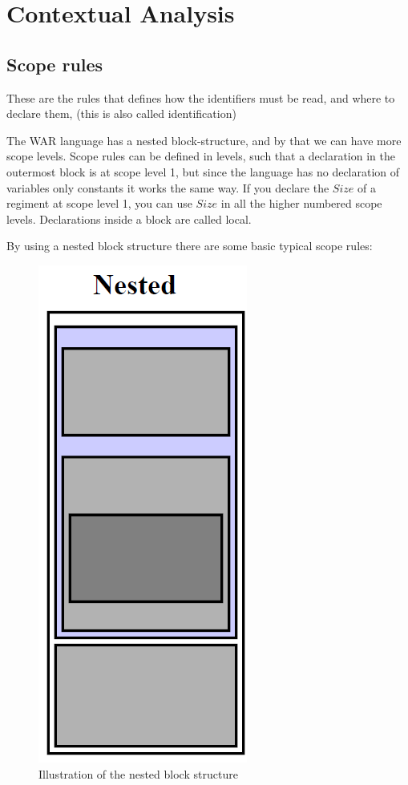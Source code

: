 \section{Contextual Analysis}

	\subsection{Scope rules}
	These are the rules that defines how the identifiers must be read, and where to declare them, (this is also called identification) 
	
	
	The WAR language has a nested block-structure, and by that we can have more scope levels. Scope rules can be defined in levels, such that a declaration in the outermost block is at scope level 1, but since the language has no declaration of variables only constants it works the same way. If you declare the $Size$ of a regiment at scope level 1, you can use $Size$ in all the higher numbered scope levels. Declarations inside a block are called local.
		\newpage

	By using a nested block structure there are some basic typical scope rules:
	\begin{figure}
		\begin{center}
			\includegraphics[scale=1]{rapport/2/figures/nested_block_structure}
		\end{center}	
		\caption{Illustration of the nested block structure}
		\label{nested_block_structure}
	\end{figure}


